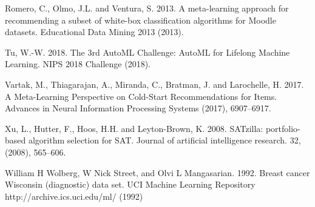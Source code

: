 \documentclass{article}
\begin{document}
\begin{thebibliography}{9}
Romero, C., Olmo, J.L. and Ventura, S. 2013. A meta-learning approach for recommending a subset of white-box classification algorithms for Moodle datasets. Educational Data Mining 2013 (2013).

Tu, W.-W. 2018. The 3rd AutoML Challenge: AutoML for Lifelong Machine Learning. NIPS 2018 Challenge (2018).

Vartak, M., Thiagarajan, A., Miranda, C., Bratman, J. and Larochelle, H. 2017. A Meta-Learning Perspective on Cold-Start Recommendations for Items. Advances in Neural Information Processing Systems (2017), 6907–6917.

Xu, L., Hutter, F., Hoos, H.H. and Leyton-Brown, K. 2008. SATzilla: portfolio-based algorithm selection for SAT. Journal of artificial intelligence research. 32, (2008), 565–606.

William H Wolberg, W Nick Street, and Olvi L Mangasarian. 1992. Breast cancer Wisconsin (diagnostic) data set. UCI Machine Learning Repository {http://archive.ics.uci.edu/ml/} (1992)

\end{thebibliography}



\end{document}
